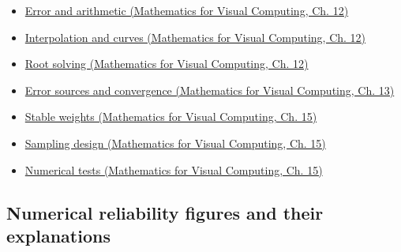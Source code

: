 \begin{itemize}
\tightlist
\item
  \href{../02-Mathematics-for-Visual-Computing/main.pdf\#nameddest=02-foundations-ii-ch028-floating-point-answers-error-conditioning-stability-and-stable-arithmetic}{Error and arithmetic (Mathematics for Visual Computing, Ch. 12)}
\item
  \href{../02-Mathematics-for-Visual-Computing/main.pdf\#nameddest=02-foundations-ii-ch028-reconstructing-values-and-curves-between-samples}{Interpolation and curves (Mathematics for Visual Computing, Ch. 12)}
\item
  \href{../02-Mathematics-for-Visual-Computing/main.pdf\#nameddest=02-foundations-ii-ch028-finding-roots-with-guarantees-and-convergence-checks}{Root solving (Mathematics for Visual Computing, Ch. 12)}
\item
  \href{../02-Mathematics-for-Visual-Computing/main.pdf\#nameddest=02-foundations-ii-ch029-separate-discretization-truncation-and-roundoff-measure-convergence}{Error sources and convergence (Mathematics for Visual Computing, Ch. 13)}
\item
  \href{../02-Mathematics-for-Visual-Computing/main.pdf\#nameddest=02-foundations-ii-ch031-keep-probability-weights-stable-before-sampling}{Stable weights (Mathematics for Visual Computing, Ch. 15)}
\item
  \href{../02-Mathematics-for-Visual-Computing/main.pdf\#nameddest=02-foundations-ii-ch031-design-samples-without-replacement-stratified-and-low-discrepancy}{Sampling design (Mathematics for Visual Computing, Ch. 15)}
\item
  \href{../02-Mathematics-for-Visual-Computing/main.pdf\#nameddest=02-foundations-ii-ch031-test-numerical-methods-and-benchmark-reproducibly}{Numerical tests (Mathematics for Visual Computing, Ch. 15)}
\end{itemize}

\subsection{Numerical reliability figures and their explanations}\label{appendix-cb5af353ef77-numerical-reliability-figures-and-their-explanations}

